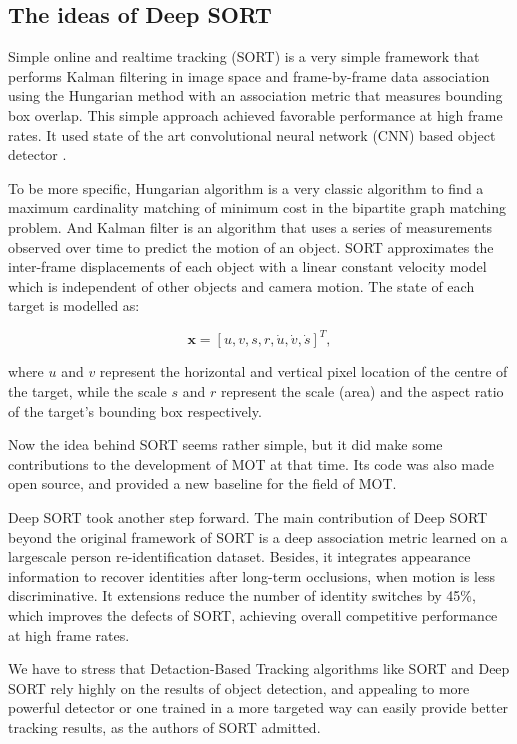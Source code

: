 \documentclass[conference]{IEEEtran}
\begin{document}
\subsection{The ideas of Deep SORT}

Simple online and realtime tracking (SORT) is a very simple framework that performs Kalman filtering in image space and frame-by-frame data association using the Hungarian method with an association metric that measures bounding box overlap. This simple approach achieved favorable performance at high frame rates. It used state of the art convolutional neural network (CNN) based object detector \cite{ren2015faster}.

To be more specific, Hungarian algorithm \cite{kuhn1955hungarian} is a very classic algorithm to find a maximum cardinality matching of minimum cost in the bipartite graph matching problem. And Kalman filter \cite{kalman1960new} is an algorithm that uses a series of measurements observed over time to predict the motion of an object. SORT approximates the inter-frame displacements of each object with a linear constant velocity model which is independent of other objects and camera motion. The state of each target is modelled as:

\[
    \boldsymbol{x} = [u,v,s,r,\dot{u},\dot{v},\dot{s}]^T, 
\]

\noindent where $u$ and $v$ represent the horizontal and vertical pixel location of the centre of the target, while the scale $s$ and $r$ represent the scale (area) and the aspect ratio of the target’s bounding box respectively.

Now the idea behind SORT seems rather simple, but it did make some contributions to the development of MOT at that time. Its code was also made open source, and provided a new baseline for the field of MOT.

Deep SORT took another step forward. The main contribution of Deep SORT beyond the original framework of SORT is a deep association metric learned on a largescale person re-identification dataset. Besides, it integrates appearance information to recover identities after long-term occlusions, when motion is less discriminative. It extensions reduce the number of identity switches by 45\%, which improves the defects of SORT, achieving overall competitive performance at high frame rates.

We have to stress that Detaction-Based Tracking algorithms like SORT and Deep SORT rely highly on the results of object detection, and appealing to more powerful detector or one trained in a more targeted way can easily provide better tracking results, as the authors of SORT admitted.
\end{document}

